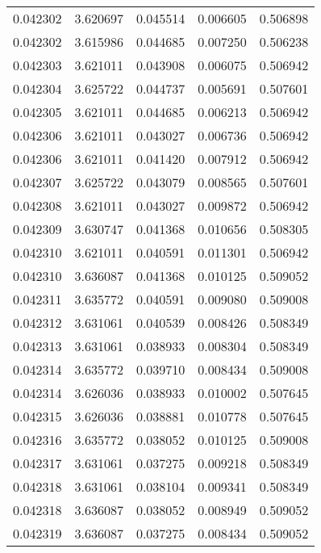 \begin{tabular}{lrrrr}
0.042302    &  3.620697 &  0.045514 &  0.006605 &             0.506898 \\
0.042302    &  3.615986 &  0.044685 &  0.007250 &             0.506238 \\
0.042303    &  3.621011 &  0.043908 &  0.006075 &             0.506942 \\
0.042304    &  3.625722 &  0.044737 &  0.005691 &             0.507601 \\
0.042305    &  3.621011 &  0.044685 &  0.006213 &             0.506942 \\
0.042306    &  3.621011 &  0.043027 &  0.006736 &             0.506942 \\
0.042306    &  3.621011 &  0.041420 &  0.007912 &             0.506942 \\
0.042307    &  3.625722 &  0.043079 &  0.008565 &             0.507601 \\
0.042308    &  3.621011 &  0.043027 &  0.009872 &             0.506942 \\
0.042309    &  3.630747 &  0.041368 &  0.010656 &             0.508305 \\
0.042310    &  3.621011 &  0.040591 &  0.011301 &             0.506942 \\
0.042310    &  3.636087 &  0.041368 &  0.010125 &             0.509052 \\
0.042311    &  3.635772 &  0.040591 &  0.009080 &             0.509008 \\
0.042312    &  3.631061 &  0.040539 &  0.008426 &             0.508349 \\
0.042313    &  3.631061 &  0.038933 &  0.008304 &             0.508349 \\
0.042314    &  3.635772 &  0.039710 &  0.008434 &             0.509008 \\
0.042314    &  3.626036 &  0.038933 &  0.010002 &             0.507645 \\
0.042315    &  3.626036 &  0.038881 &  0.010778 &             0.507645 \\
0.042316    &  3.635772 &  0.038052 &  0.010125 &             0.509008 \\
0.042317    &  3.631061 &  0.037275 &  0.009218 &             0.508349 \\
0.042318    &  3.631061 &  0.038104 &  0.009341 &             0.508349 \\
0.042318    &  3.636087 &  0.038052 &  0.008949 &             0.509052 \\
0.042319    &  3.636087 &  0.037275 &  0.008434 &             0.509052 \\

\end{tabular}
